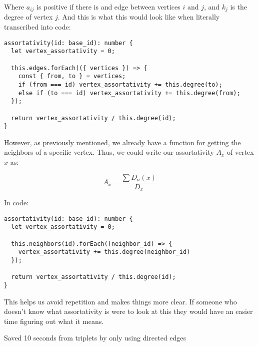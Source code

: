Where $a_{ij}$ is positive if there is and edge between vertices $i$ and $j$,
and $k_j$ is the degree of vertex $j$.
And this is what this would look like when literally transcribed into code:

\begin{verbatim}
assortativity(id: base_id): number {
  let vertex_assortativity = 0;

  this.edges.forEach(({ vertices }) => {
    const { from, to } = vertices;
    if (from === id) vertex_assortativity += this.degree(to);
    else if (to === id) vertex_assortativity += this.degree(from);
  });

  return vertex_assortativity / this.degree(id);
}
\end{verbatim}

However, as previously mentioned, we already have a function for getting the neighbors of a specific vertex.
Thus, we could write our assortativity $A_x$ of vertex $x$ as:

$$A_x=\frac{\sum{D_n(x)}}{D_x}$$

In code:

\begin{verbatim}
assortativity(id: base_id): number {
  let vertex_assortativity = 0;

  this.neighbors(id).forEach((neighbor_id) => {
    vertex_assortativity += this.degree(neighbor_id)
  });

  return vertex_assortativity / this.degree(id);
}
\end{verbatim}

This helps us avoid repetition and makes things more clear.
If someone who doesn't know what assortativity is were to look at this
they would have an easier time figuring out what it means.

Saved 10 seconds from triplets by only using directed edges